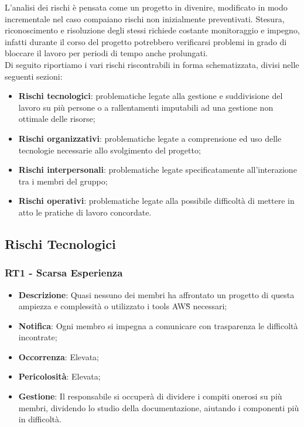 L'analisi dei rischi è pensata come un progetto in divenire, modificato in modo incrementale nel caso compaiano rischi non inizialmente preventivati. Stesura, riconoscimento e risoluzione degli stessi richiede costante monitoraggio e impegno, infatti durante il corso del progetto potrebbero verificarsi problemi in grado di bloccare il lavoro per periodi di tempo anche prolungati. \\
 Di seguito riportiamo i vari rischi riscontrabili in forma schematizzata, divisi nelle seguenti sezioni:
\begin{itemize}
   \item \textbf{Rischi tecnologici}: problematiche legate alla gestione e suddivisione del lavoro su più persone o a rallentamenti imputabili ad una gestione non ottimale delle risorse;
   \item \textbf{Rischi organizzativi}: problematiche legate a comprensione ed uso delle tecnologie necessarie allo svolgimento del progetto;
   \item \textbf{Rischi interpersonali}: problematiche legate specificatamente all'interazione tra i membri del gruppo;
   \item \textbf{Rischi operativi}: problematiche legate alla possibile difficoltà di mettere in atto le pratiche di lavoro concordate.
\end{itemize}

   \subsection{Rischi Tecnologici}
   
   \subsubsection*{RT1 - Scarsa Esperienza}
   \begin{itemize}
   	\item \textbf{Descrizione}: Quasi nessuno dei membri ha affrontato un progetto di questa ampiezza e complessità o utilizzato i tools AWS\G{} necessari;
   	\item \textbf{Notifica}: Ogni membro si impegna a comunicare con trasparenza le difficoltà incontrate;
   	\item \textbf{Occorrenza}: Elevata;
   	\item \textbf{Pericolosità}: Elevata;
   	\item \textbf{Gestione}: Il responsabile si occuperà di dividere i compiti onerosi su più membri, dividendo lo studio della documentazione, aiutando i componenti più in difficoltà.
   \end{itemize}


